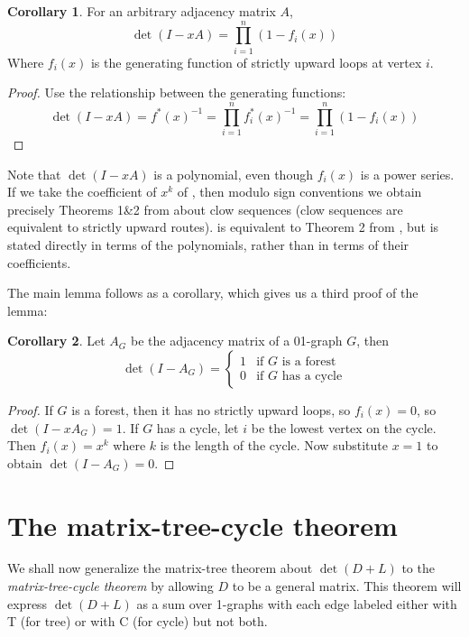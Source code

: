 \documentclass[a4paper, 11pt]{article}
\theoremstyle{definition}
\newtheorem{corollary}{Corollary}[theorem]
\begin{document}
\begin{corollary}
  \label{cor:strictlyupwardloops}
  For an arbitrary adjacency matrix $A$,
  \[ \det(I - xA) = \prod_{i = 1}^n (1 - f_i(x)) \]
  Where $f_i(x)$ is the generating function of strictly upward loops at vertex $i$.
\end{corollary}
\begin{proof}
  Use the relationship between the generating functions:
  \[
    \det(I - xA) = f^{*}(x)^{-1} = \prod_{i=1}^n f^{*}_i(x)^{-1} = \prod_{i=1}^n (1 - f_i(x))
  \]
\end{proof}

Note that $\det(I - xA)$ is a polynomial, even though $f_i(x)$ is a power series. If we take the coefficient of $x^k$ of , then modulo sign conventions we obtain precisely Theorems 1\&2 from \cite{Rote2001} about clow sequences (clow sequences are equivalent to strictly upward routes).  is equivalent to Theorem 2 from \cite{Rote2001}, but is stated directly in terms of the polynomials, rather than in terms of their coefficients.

The main lemma follows as a corollary, which gives us a third proof of the lemma:

\begin{corollary}
  Let $A_G$ be the adjacency matrix of a 01-graph $G$, then
  \[
    \det(I-A_G) = \begin{cases}
      1 & \text{if $G$ is a forest}\\
      0 & \text{if $G$ has a cycle}
    \end{cases}
  \]
\end{corollary}
\begin{proof}
  If $G$ is a forest, then it has no strictly upward loops, so $f_i(x) = 0$, so $\det(I - xA_G) = 1$. If $G$ has a cycle, let $i$ be the lowest vertex on the cycle. Then $f_i(x) = x^k$ where $k$ is the length of the cycle. Now substitute $x = 1$ to obtain $\det(I - A_G) = 0$.
\end{proof}

\section{The matrix-tree-cycle theorem}

We shall now generalize the matrix-tree theorem about $\det(D + L)$ to the \emph{matrix-tree-cycle theorem} by allowing $D$ to be a general matrix. This theorem will express $\det(D + L)$ as a sum over 1-graphs with each edge labeled either with T (for tree) or with C (for cycle) but not both.
\end{document}
